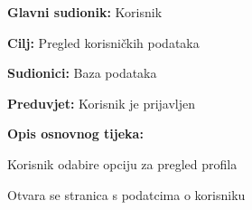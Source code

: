 					

						\noindent {}
                        	\begin{packed_item}
                        		
                        		\item \textbf{Glavni sudionik: }Korisnik
                        		\item  \textbf{Cilj:} Pregled korisničkih podataka
                        		\item  \textbf{Sudionici:} Baza podataka
                        		\item  \textbf{Preduvjet:} Korisnik je prijavljen
                        		\item  \textbf{Opis osnovnog tijeka:}
                        		
                        		\item[] \begin{packed_enum}
                        			
                        			\item Korisnik odabire opciju za pregled profila
                        			\item Otvara se stranica s podatcima o korisniku
                        		\end{packed_enum}
                        		
                        		
                        	\end{packed_item}
                        	
